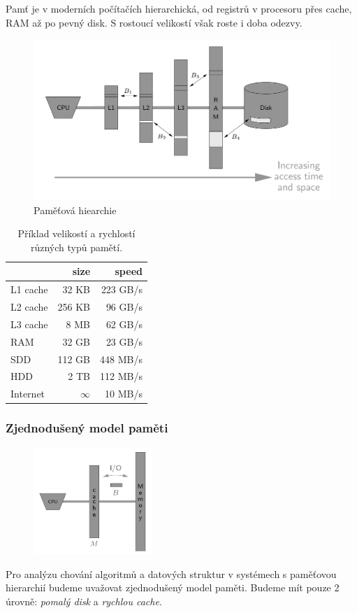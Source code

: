 \documentclass[11pt]{report} %
\numberwithin{equation}{section}
\begin{document}
Pamť je v moderních počítačích hierarchická, od registrů v procesoru přes cache, RAM až po pevný disk. S rostoucí velikostí však roste i doba odezvy. 
\begin{figure}[H]
	\centering\includegraphics[]{img/memory.png}
	\caption{Paměťová hiearchie}
\end{figure}

\begin{table}[H]
	\centering
	\begin{tabular}{|l|r|r|}
		\hline
		& size & speed \\ \hline
		L1 cache & 32 KB & 223 GB/s \\ \hline
		L2 cache & 256 KB & 96 GB/s \\ \hline
		L3 cache & 8 MB & 62 GB/s \\ \hline		
		RAM 	& 32 GB & 23 GB/s \\ \hline		
		SDD 	& 112 GB & 448 MB/s \\ \hline		
		HDD 	& 2 TB & 112 MB/s \\ \hline		
		Internet & $\infty$ & 10 MB/s \\ \hline		
	\end{tabular}
	\caption{Příklad velikostí a rychlostí různých typů pamětí.}
\end{table}

\subsubsection{Zjednodušený model paměti}
\begin{figure}
	\includegraphics[width=0.4\textwidth]{img/memory_simple.png}
\end{figure}
Pro analýzu chování algoritmů a datových struktur v systémech s paměťovou hierarchií budeme uvažovat zjednodušený model paměti. Budeme mít pouze 2 úrovně: \textit{pomalý disk} a \textit{rychlou cache}.
\end{document}
